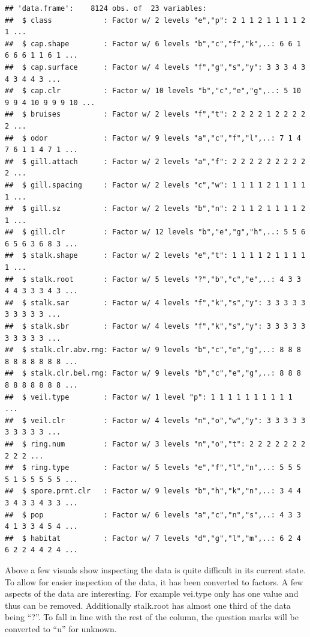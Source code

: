 \documentclass[
  english,
  man]{apa6}
\begin{document}
\begin{verbatim}
## 'data.frame':    8124 obs. of  23 variables:
##  $ class            : Factor w/ 2 levels "e","p": 2 1 1 2 1 1 1 1 2 1 ...
##  $ cap.shape        : Factor w/ 6 levels "b","c","f","k",..: 6 6 1 6 6 6 1 1 6 1 ...
##  $ cap.surface      : Factor w/ 4 levels "f","g","s","y": 3 3 3 4 3 4 3 4 4 3 ...
##  $ cap.clr          : Factor w/ 10 levels "b","c","e","g",..: 5 10 9 9 4 10 9 9 9 10 ...
##  $ bruises          : Factor w/ 2 levels "f","t": 2 2 2 2 1 2 2 2 2 2 ...
##  $ odor             : Factor w/ 9 levels "a","c","f","l",..: 7 1 4 7 6 1 1 4 7 1 ...
##  $ gill.attach      : Factor w/ 2 levels "a","f": 2 2 2 2 2 2 2 2 2 2 ...
##  $ gill.spacing     : Factor w/ 2 levels "c","w": 1 1 1 1 2 1 1 1 1 1 ...
##  $ gill.sz          : Factor w/ 2 levels "b","n": 2 1 1 2 1 1 1 1 2 1 ...
##  $ gill.clr         : Factor w/ 12 levels "b","e","g","h",..: 5 5 6 6 5 6 3 6 8 3 ...
##  $ stalk.shape      : Factor w/ 2 levels "e","t": 1 1 1 1 2 1 1 1 1 1 ...
##  $ stalk.root       : Factor w/ 5 levels "?","b","c","e",..: 4 3 3 4 4 3 3 3 4 3 ...
##  $ stalk.sar        : Factor w/ 4 levels "f","k","s","y": 3 3 3 3 3 3 3 3 3 3 ...
##  $ stalk.sbr        : Factor w/ 4 levels "f","k","s","y": 3 3 3 3 3 3 3 3 3 3 ...
##  $ stalk.clr.abv.rng: Factor w/ 9 levels "b","c","e","g",..: 8 8 8 8 8 8 8 8 8 8 ...
##  $ stalk.clr.bel.rng: Factor w/ 9 levels "b","c","e","g",..: 8 8 8 8 8 8 8 8 8 8 ...
##  $ veil.type        : Factor w/ 1 level "p": 1 1 1 1 1 1 1 1 1 1 ...
##  $ veil.clr         : Factor w/ 4 levels "n","o","w","y": 3 3 3 3 3 3 3 3 3 3 ...
##  $ ring.num         : Factor w/ 3 levels "n","o","t": 2 2 2 2 2 2 2 2 2 2 ...
##  $ ring.type        : Factor w/ 5 levels "e","f","l","n",..: 5 5 5 5 1 5 5 5 5 5 ...
##  $ spore.prnt.clr   : Factor w/ 9 levels "b","h","k","n",..: 3 4 4 3 4 3 3 4 3 3 ...
##  $ pop              : Factor w/ 6 levels "a","c","n","s",..: 4 3 3 4 1 3 3 4 5 4 ...
##  $ habitat          : Factor w/ 7 levels "d","g","l","m",..: 6 2 4 6 2 2 4 4 2 4 ...
\end{verbatim}

Above a few visuals show inspecting the data is quite difficult in its current state. To allow for easier inspection of the data, it has been converted to factors. A few aspects of the data are interesting. For example vei.type only has one value and thus can be removed. Additionally stalk.root has almost one third of the data being \enquote{?}. To fall in line with the rest of the column, the question marks will be converted to \enquote{u} for unknown.
\end{document}
